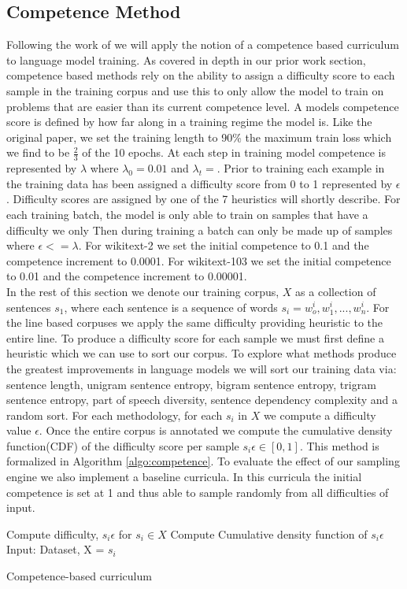 \subsection{Competence Method}
Following the work of \cite{Platanios2019CompetencebasedCL} we will apply the notion of a competence based curriculum to language model training. As covered in depth in our prior work section, competence based methods rely on the ability to assign a difficulty score to each sample in the training corpus and use this to only allow the model to train on problems that are easier than its current competence level. A models competence score is defined by how far along in a training regime the model is. Like the original paper, we set the training length to 90\% the maximum train loss which we find to be $\frac{2}{3}$ of the 10 epochs. At each step in training model competence is represented by $\lambda$ where $\lambda_0 = 0.01$ and $\lambda_t = $.  Prior to training each example in the training data has been assigned a difficulty score from 0 to 1 represented by $\epsilon$. Difficulty scores are assigned by one of the 7 heuristics will shortly describe.  For each training batch, the model is only able to train on samples that have a difficulty we only Then during training a batch can only be made up of samples where $\epsilon <= \lambda$. For wikitext-2 we set the initial competence to 0.1 and the competence increment to 0.0001. For wikitext-103 we set the initial competence to 0.01 and the competence increment to 0.00001.\\
In the rest of this section we denote our
training corpus, $X$ as a collection of sentences $s_1$, where each sentence is a sequence of words $s_i= w_o^i,w_1^i,...,w_n^i$. For the line based corpuses we apply the same difficulty providing heuristic to the entire line.
To produce a difficulty score for each sample we must first define a heuristic which we can use to sort our corpus. To explore what methods produce the greatest improvements in language models we will sort our training data via: sentence length, unigram sentence entropy, bigram sentence entropy, trigram sentence entropy, part of speech diversity, sentence dependency complexity and a random sort. For each methodology, for each $s_i$ in $X$ we compute a difficulty value $\epsilon$. Once the entire corpus is annotated we compute the cumulative density function(CDF) of the difficulty score per sample $s_i\epsilon \in [0,1]$. This method is formalized in Algorithm \ref{algo:competence}. To evaluate the effect of our sampling engine we also implement a baseline curricula. In this curricula the initial competence is set at 1 and thus able to sample randomly from all difficulties of input. \\
\begin{algorithm}[H]
\label{algo:competence}
\SetAlgoLined
{}
Compute difficulty, $s_i\epsilon$ for $s_i \in X$\;
Compute Cumulative density function of $s_i\epsilon$\;
Input: Dataset, X = {$s_i$}\;
\caption{Competence-based curriculum}
\end{algorithm}
